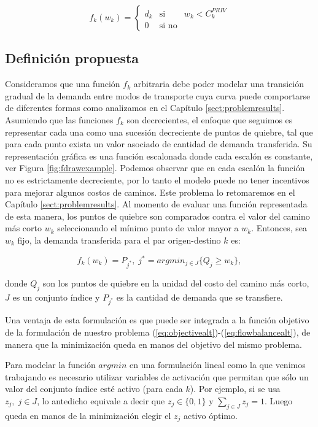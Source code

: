 \begin{equation}
  \label{eq:allornothing}
  f_k(w_k) = \left\{ \begin{array}{lcr}
    d_k & \mbox{si}   & w_k < C^{PRIV}_k \\
          0 & \mbox{si no} &
  \end{array}
  \right.
\end{equation}

\subsection{Definición propuesta}

Consideramos que una función $f_k$ arbitraria debe poder modelar una transición gradual de la demanda entre modos de transporte cuya curva puede comportarse de diferentes formas como analizamos en el Capítulo \ref{sect:problemresults}. Asumiendo que las funciones $f_k$ son decrecientes, el enfoque que seguimos es representar cada una como una sucesión decreciente de puntos de quiebre, tal que para cada punto exista un valor asociado de cantidad de demanda transferida. Su representación gráfica es una función escalonada donde cada escalón es constante, ver Figura \ref{fig:fdrawexample}. Podemos observar que en cada escalón la función no es estrictamente decreciente, por lo tanto el modelo puede no tener incentivos para mejorar algunos costos de caminos. Este problema lo retomaremos en el Capítulo \ref{sect:problemresults}. Al momento de evaluar una función representada de esta manera, los puntos de quiebre son comparados contra el valor del camino más corto $w_k$ seleccionando el mínimo punto de valor mayor a $w_k$. Entonces, sea $w_k$ fijo, la demanda transferida para el par origen-destino $k$ es:

\begin{equation}
  \label{eq:deffks}
  f_k(w_k) = P_{j^*},\; j^* = argmin_{j \in J} \{Q_j \geq w_k\},
\end{equation}

donde $Q_j$ son los puntos de quiebre en la unidad del costo del camino más corto, $J$ es un conjunto índice y $P_{j^*}$ es la cantidad de demanda que se transfiere.

Una ventaja de esta formulación es que puede ser integrada a la función objetivo de la formulación de nuestro problema (\ref{eq:objectivealt})-(\ref{eq:flowbalancealt}), de manera que la minimización queda en manos del objetivo del mismo problema.

Para modelar la función $argmin$ en una formulación lineal como la que venimos trabajando es necesario utilizar variables de activación que permitan que sólo un valor del conjunto índice esté activo (para cada $k$). Por ejemplo, si se usa $z_j,\; j \in J$, lo antedicho equivale a decir que $z_j \in \{0,1\}$ y $\sum_{j \in J} z_j = 1$. Luego queda en manos de la minimización elegir el $z_j$ activo óptimo.

